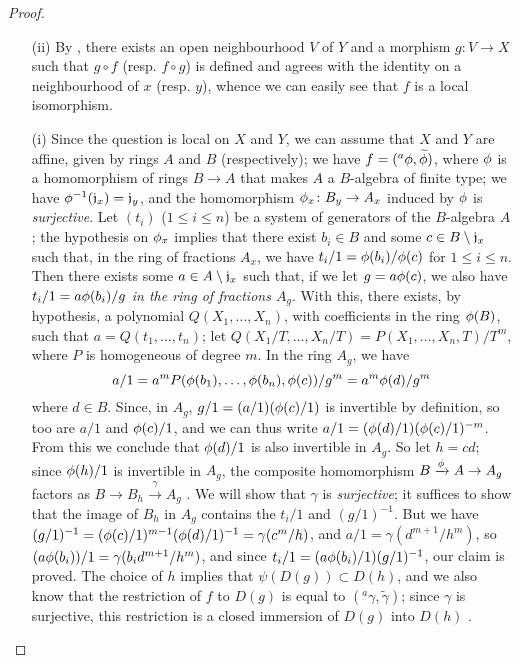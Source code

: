 \begin{proof}
\label{proof-1.6.5.4}
\begin{itemize}
    \item[(ii)] By , there exists an open neighbourhood $V$ of $Y$ and a morphism $g\colon V\to X$ such that $g\circ f$ (resp. $f\circ g$) is defined and agrees with the identity on a neighbourhood of $x$ (resp. $y$), whence we can easily see that $f$ is a local isomorphism.
    \item[(i)] Since the question is local on $X$ and $Y$, we can assume that $X$ and $Y$ are affine, given by rings $A$ and $B$ (respectively);
    we have $f=({}^a\phi,\widetilde{\phi})$, where $\phi$ is a homomorphism of rings $B\to A$ that makes $A$ a $B$-algebra of finite type;
    we have $\phi^{-1}(\mathfrak{j}_x)=\mathfrak{j}_y$, and the homomorphism $\phi_x\colon B_y\to A_x$ induced by $\phi$ is \emph{surjective}.
    Let $(t_i)$ ($1\leqslant i\leqslant n$) be a system of generators of the $B$-algebra $A$;
    the hypothesis on $\phi_x$ implies that there exist $b_i\in B$ and some $c\in B\setminus\mathfrak{j}_x$ such that, in the ring of fractions $A_x$, we have $t_i/1=\phi(b_i)/\phi(c)$ for $1\leqslant i\leqslant n$.
    Then  there exists some $a\in A\setminus\mathfrak{j}_x$ such that, if we let $g=a\phi(c)$, we also have $t_i/1=a\phi(b_i)/g$ \emph{in the ring of fractions $A_g$}.
    With this, there exists, by hypothesis, a polynomial $Q(X_1,\ldots,X_n)$, with coefficients in the ring $\phi(B)$, such that $a=Q(t_1,\ldots,t_n)$;
    let $Q(X_1/T,\ldots,X_n/T)=P(X_1,\ldots,X_n,T)/T^m$, where $P$ is homogeneous of degree $m$.
    In the ring $A_g$, we have
    \begin{equation*}
        a/1 = a^mP(\phi(b_1),\ldots,\phi(b_n),\phi(c))/g^m = a^m\phi(d)/g^m
    \end{equation*}
    where $d\in B$.
    Since, in $A_g$, $g/1=(a/1)(\phi(c)/1)$ is invertible by definition, so too are $a/1$ and $\phi(c)/1$, and we can thus write $a/1=(\phi(d)/1)(\phi(c)/1)^{-m}$.
    From this we conclude that $\phi(d)/1$ is also invertible in $A_g$.
    So let $h=cd$;
    since $\phi(h)/1$ is invertible in $A_g$, the composite homomorphism $B\xrightarrow{\phi}A\to A_g$ factors as $B\to B_h\xrightarrow{\gamma}A_g$ .
    We will show that $\gamma$ is \emph{surjective};
    it suffices to show that the image of $B_h$ in $A_g$ contains the $t_i/1$ and $(g/1)^{-1}$.
    But we have $(g/1)^{-1}=(\phi(c)/1)^{m-1}(\phi(d)/1)^{-1}=\gamma(c^m/h)$, and $a/1=\gamma(d^{m+1}/h^m)$, so $(a\phi(b_i))/1=\gamma(b_id^{m+1}/h^m)$, and since $t_i/1=(a\phi(b_i)/1)(g/1)^{-1}$, our claim is proved.
    The choice of $h$ implies that $\psi(D(g))\subset D(h)$, and we also know that the restriction of $f$ to $D(g)$ is equal to $({}^a\gamma,\widetilde{\gamma})$;
    since $\gamma$ is surjective, this restriction is a closed immersion of $D(g)$ into $D(h)$ .
\end{itemize}
\end{proof}

